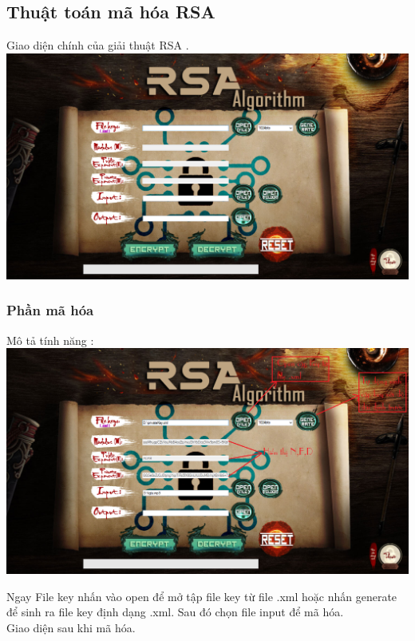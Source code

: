 \documentclass[paper=a4, fontsize=11pt]{scrartcl}	%
\numberwithin{equation}{section}															%
\numberwithin{figure}{section}																%
\numberwithin{table}{section}																%
\begin{document}
		
		
	\subsection{Thuật toán mã hóa RSA}
		{Giao diện chính của giải thuật RSA} .\\
		
		\includegraphics[scale=0.4]{RSA_GiaoDien}
		
		\subsubsection{Phần mã hóa}
		Mô tả tính năng : \\
		
		\includegraphics[scale = 0.4]{RSA_MOTA}
	    
	    Ngay File key nhấn vào open để mở tập file key từ file .xml hoặc nhấn generate để sinh ra file key định dạng .xml. Sau đó chọn file input để mã hóa.\\
	    
	    Giao diện sau khi mã hóa.\\
	    
\end{document}
